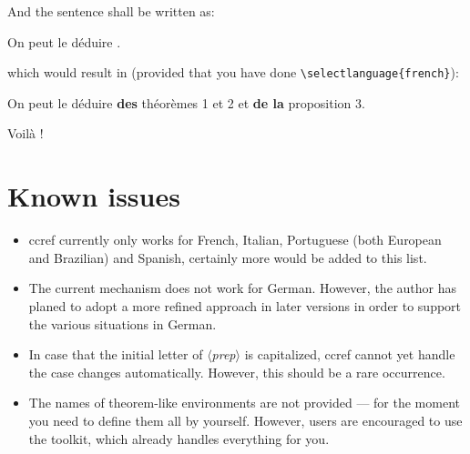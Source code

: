\documentclass[classical]{einfart}
\providecommand{\meta}[1]{$\langle${\normalfont\itshape#1}$\rangle$}
\newenvironment{demo}{%
    \LocallyStopLineNumbers%
    \begin{tcolorbox}[enhanced jigsaw,pad at break*=1mm,breakable,
        left=4mm,right=4mm,top=0.5mm,bottom=0mm,
        colback=gray!5!paper,boxrule=0pt,frame hidden,
        borderline west={1.5mm}{0mm}{gray!55!paper},arc=.7mm]%
}{\end{tcolorbox}\ResumeLineNumbers}
\newcommand{\ccrefpackage}{\textsf{ccref}}
\begin{document}
And the sentence shall be written as:

\begin{code}
On peut le déduire .
\end{code}

which would result in (provided that you have done \lstinline|\selectlanguage{french}|):

\begin{demo}
    On peut le déduire \textbf{des} théorèmes 1 et 2 et \textbf{de la} proposition 3.
\end{demo}

Voilà !


\section{Known issues}
\begin{itemize}
    \item \ccrefpackage{} currently only works for French, Italian, Portuguese (both European and Brazilian) and Spanish, certainly more would be added to this list.
    \item The current mechanism does not work for German. However, the author has planed to adopt a more refined approach in later versions in order to support the various situations in German.
    \item In case that the initial letter of \meta{prep} is capitalized, \ccrefpackage{} cannot yet handle the case changes automatically. However, this should be a rare occurrence.
    \item The names of theorem-like environments are not provided --- for the moment you need to define them all by yourself. However, users are encouraged to use the \ProjLib{} toolkit, which already handles everything for you.
\end{itemize}
\end{document}
